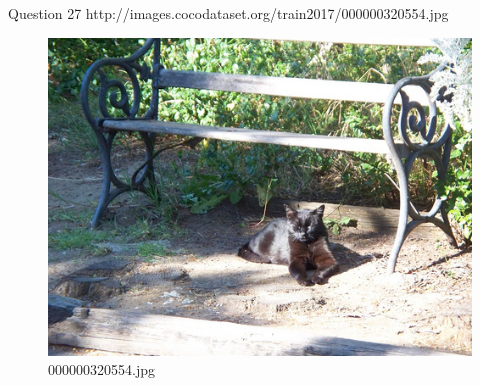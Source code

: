 Question 27
http://images.cocodataset.org/train2017/000000320554.jpg
    \begin{figure}[h]
        \centering
        \includegraphics[width=0.8\linewidth]{../image set/easy/000000320554.jpg}
        \caption{000000320554.jpg}
    \end{figure}
